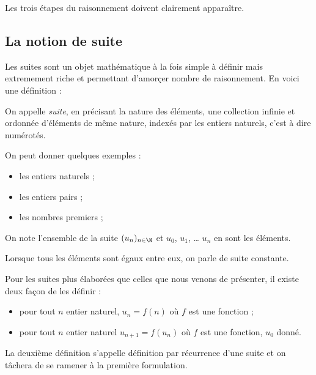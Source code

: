 \documentclass[12pt,a4paper,frenchb]{article}
\begin{document}
Les trois étapes du raisonnement doivent clairement apparaître.

\subsection{La notion de suite}

Les suites sont un objet mathématique à la fois simple à définir mais
extremement riche et permettant d'amorçer nombre de raisonnement. En
voici une définition :
\begin{definition}
  On appelle \emph{suite}, en précisant la nature des éléments, une
  collection infinie et ordonnée d'éléments de même nature, indexés par
  les entiers naturels, c'est à dire numérotés.
\end{definition}

On peut donner quelques exemples :
\begin{itemize}
  \item les entiers naturels ;
  \item les entiers pairs ;
  \item les nombres premiers ;
\end{itemize}

On note l'ensemble de la suite $(u_n)_{n\in\N}$ et $u_0$, $u_1$, \dots
$u_n$ en sont les éléments.

Lorsque tous les éléments sont égaux entre eux, on parle de suite
constante.

Pour les suites plus élaborées que celles que nous venons de présenter,
il existe deux façon de les définir :
\begin{itemize}
  \item pour tout $n$ entier naturel, $u_n = f(n)$ où $f$ est une
    fonction ;
  \item pour tout $n$ entier naturel $u_{n+1} = f(u_n)$ où $f$ est une
    fonction, $u_0$ donné.
\end{itemize}
La deuxième définition s'appelle définition par récurrence d'une suite
et on tâchera de se ramener à la première formulation.

\end{document}
